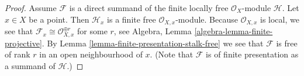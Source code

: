\begin{proof}
Assume $\mathcal{F}$ is a direct summand of the finite locally free
$\mathcal{O}_X$-module $\mathcal{H}$.
Let $x \in X$ be a point. Then $\mathcal{H}_x$ is a finite free
$\mathcal{O}_{X, x}$-module.
Because $\mathcal{O}_{X, x}$ is local, we see that
$\mathcal{F}_x \cong \mathcal{O}_{X, x}^{\oplus r}$ for some $r$, see
Algebra, Lemma \ref{algebra-lemma-finite-projective}.
By Lemma \ref{lemma-finite-presentation-stalk-free}
we see that $\mathcal{F}$ is free of rank $r$ in an open neighbourhood of $x$.
(Note that $\mathcal{F}$ is of finite presentation as a summand of
$\mathcal{H}$.)
\end{proof}





